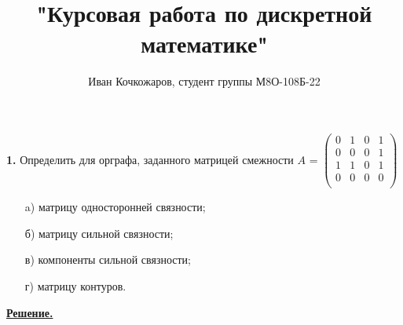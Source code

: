 \documentclass[12pt, letterpaper, titlepage]{article}
\title{"Курсовая работа по дискретной математике"}
\author{Иван Кочкожаров, студент группы М8О-108Б-22}
\begin{document}
\maketitle
\textbf{1.} Определить для орграфа, заданного матрицей смежности $A$ = 
$
\begin{pmatrix}
    0 & 1 & 0 & 1\\
    0 & 0 & 0 & 1\\
    1 & 1 & 0 & 1\\
    0 & 0 & 0 & 0\\
\end{pmatrix}
$
\begin{itemize}
    \item[a)] матрицу односторонней связности;
    \item[б)] матрицу сильной связности;
    \item[в)] компоненты сильной связности;
    \item[г)] матрицу контуров.
\end{itemize}
\underline{\textbf{Решение.}}
\end{document}

